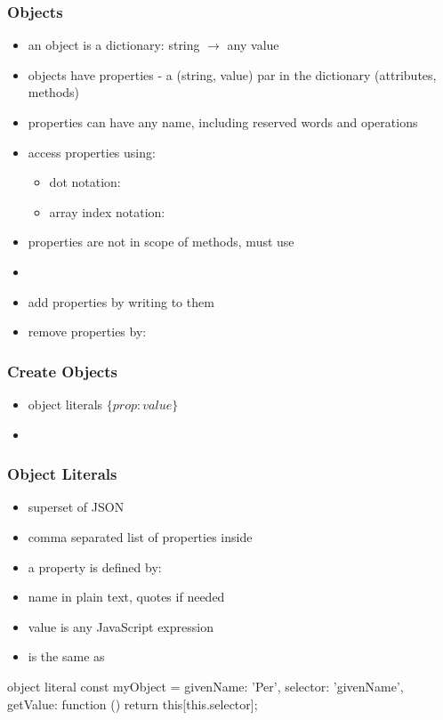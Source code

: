 \begin{frame}[fragile] \frametitle{Objects}
\begin{itemize}
  \item an object is a dictionary: string $\rightarrow$ any value
  \item objects have properties - a (string, value) par in the dictionary (attributes, methods)
  \item properties can have any name, including reserved words and operations
  \item access properties using:
  \begin{itemize}
    \item dot notation: 
    \item array index notation: 
  \end{itemize}
  \item properties are not in scope of methods, must use 
  \item {}
  \item add properties by writing to them 
  \item remove properties by: 
\end{itemize}
\end{frame}

\begin{frame}[fragile] \frametitle{Create Objects}
\begin{itemize}
  \item object literals $\{prop: value\}$
  \item {}
\end{itemize}
\end{frame}

\begin{frame}[fragile] \frametitle{Object Literals}
\begin{itemize}
  \item superset of JSON
  \item comma separated list of properties inside \code{\{ \}}
  \item a property is defined by: 
  \item name in plain text, quotes if needed 
  \item value is any JavaScript expression
  \item {} is the same as 
\end{itemize}
\begin{CodeBox}{object literal}
const myObject = {
  givenName: 'Per',
  selector: 'givenName',
  getValue: function () {
    return this[this.selector];
  }
 }
\end{CodeBox}
\end{frame}

